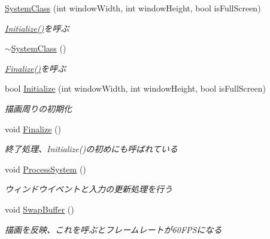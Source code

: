 \begin{DoxyCompactItemize}
\item 
\mbox{\hyperlink{class_k___system_1_1_system_class_a0202cc960e52ef4b51f0decb3c3fb35d}{System\+Class}} (int window\+Width, int window\+Height, bool is\+Full\+Screen)
\begin{DoxyCompactList}\small\item\em \mbox{\hyperlink{class_k___system_1_1_system_class_a2db013b3b45f150df5355fd5265c8705}{Initialize()}}を呼ぶ \end{DoxyCompactList}\item 
\mbox{\hyperlink{class_k___system_1_1_system_class_a5bdd9b6b328727510a660dc7ab9ea8ac}{$\sim$\+System\+Class}} ()
\begin{DoxyCompactList}\small\item\em \mbox{\hyperlink{class_k___system_1_1_system_class_a93d05d4f421da35f53c4969e53ca7d49}{Finalize()}}を呼ぶ \end{DoxyCompactList}\item 
bool \mbox{\hyperlink{class_k___system_1_1_system_class_a2db013b3b45f150df5355fd5265c8705}{Initialize}} (int window\+Width, int window\+Height, bool is\+Full\+Screen)
\begin{DoxyCompactList}\small\item\em 描画周りの初期化 \end{DoxyCompactList}\item 
void \mbox{\hyperlink{class_k___system_1_1_system_class_a93d05d4f421da35f53c4969e53ca7d49}{Finalize}} ()
\begin{DoxyCompactList}\small\item\em 終了処理、\+Initialize()の初めにも呼ばれている \end{DoxyCompactList}\item 
void \mbox{\hyperlink{class_k___system_1_1_system_class_a242be8d90313c17762b0013c30cafa47}{Process\+System}} ()
\begin{DoxyCompactList}\small\item\em ウィンドウイベントと入力の更新処理を行う \end{DoxyCompactList}\item 
void \mbox{\hyperlink{class_k___system_1_1_system_class_afe66afc17d7cad5199f4e8a1dd62b472}{Swap\+Buffer}} ()
\begin{DoxyCompactList}\small\item\em 描画を反映、これを呼ぶとフレームレートが60\+F\+P\+Sになる \end{DoxyCompactList}\item 

\end{DoxyCompactItemize}
